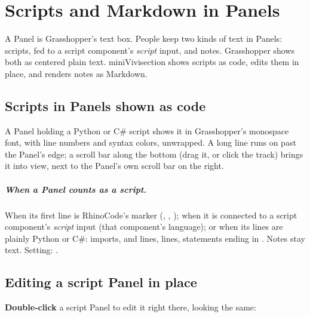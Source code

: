 \chapter{Scripts and Markdown in Panels}\label{ch:panels}

A Panel is Grasshopper's text box. People keep two kinds of text in Panels: scripts, fed to a script component's
\emph{script} input, and notes. Grasshopper shows both as centered plain text. miniVivisection shows scripts as
code, edits them in place, and renders notes as Markdown.

\section{Scripts in Panels shown as code}\label{sec:panelcode}

A Panel holding a Python or C\# script shows it in Grasshopper's monospace font, with line numbers and syntax
colors, unwrapped. A long line runs on past the Panel's edge; a scroll bar along the bottom (drag it, or click the
track) brings it into view, next to the Panel's own scroll bar on the right.


\paragraph{When a Panel counts as a script.} When its first line is RhinoCode's marker (,
, ); when it is connected to a script component's \emph{script} input (that
component's language); or when its lines are plainly Python or C\#: imports,  and  lines,
 lines, statements ending in \code{;}. Notes stay text. Setting: .

\section{Editing a script Panel in place}\label{sec:paneledit}

\textbf{Double-click} a script Panel to edit it right there, looking the same:

